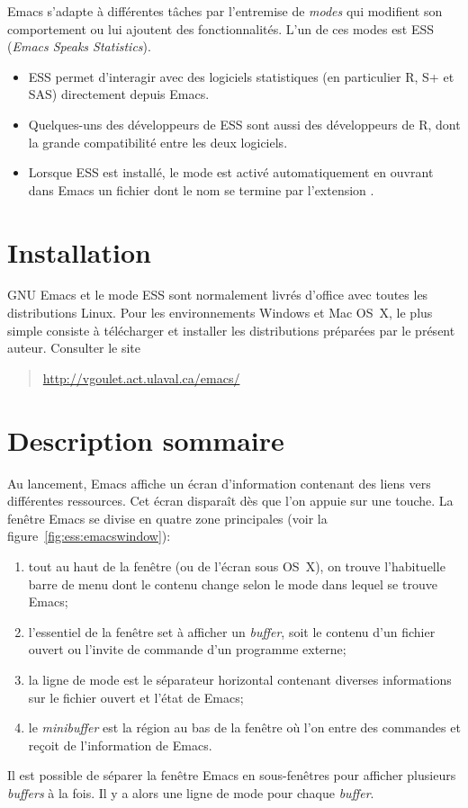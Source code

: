 Emacs s'adapte à différentes tâches par l'entremise de \emph{modes}
qui modifient son comportement ou lui ajoutent des fonctionnalités.
L'un de ces modes est ESS (\emph{Emacs Speaks Statistics}).
\begin{itemize}
\item ESS permet d'interagir avec des logiciels statistiques (en
  particulier R, S+ et SAS) directement depuis Emacs.
\item Quelques-uns des développeurs de ESS sont aussi des développeurs
  de R, dont la grande compatibilité entre les deux logiciels.
\item Lorsque ESS est installé, le mode est activé automatiquement en
  ouvrant dans Emacs un fichier dont le nom se termine par l'extension
  .
\end{itemize}


\section{Installation}
\label{emacs+ess:installation}

GNU Emacs et le mode ESS sont normalement livrés d'office avec toutes
les distributions Linux. Pour les environnements Windows et Mac OS~X,
le plus simple consiste à télécharger et installer les distributions
préparées par le présent auteur. Consulter le site
\begin{quote}
  \url{http://vgoulet.act.ulaval.ca/emacs/}
\end{quote}


\section{Description sommaire}
\label{emacs+ess:description}

Au lancement, Emacs affiche un écran d'information contenant des liens
vers différentes ressources. Cet écran disparaît dès que l'on appuie
sur une touche. La fenêtre Emacs se divise en quatre zone principales
(voir la figure~\ref{fig:ess:emacswindow}):
\begin{enumerate}
\item tout au haut de la fenêtre (ou de l'écran sous OS~X), on trouve
  l'habituelle barre de menu dont le contenu change selon le mode dans
  lequel se trouve Emacs;
\item l'essentiel de la fenêtre set à afficher un \emph{buffer}, soit
  le contenu d'un fichier ouvert ou l'invite de commande d'un
  programme externe;
\item la ligne de mode est le séparateur horizontal contenant diverses
  informations sur le fichier ouvert et l'état de Emacs;
\item le \emph{minibuffer} est la région au bas de la fenêtre où l'on
  entre des commandes et reçoit de l'information de Emacs.
\end{enumerate}
Il est possible de séparer la fenêtre Emacs en sous-fenêtres pour
afficher plusieurs \emph{buffers} à la fois. Il y a alors une ligne de
mode pour chaque \emph{buffer}.

